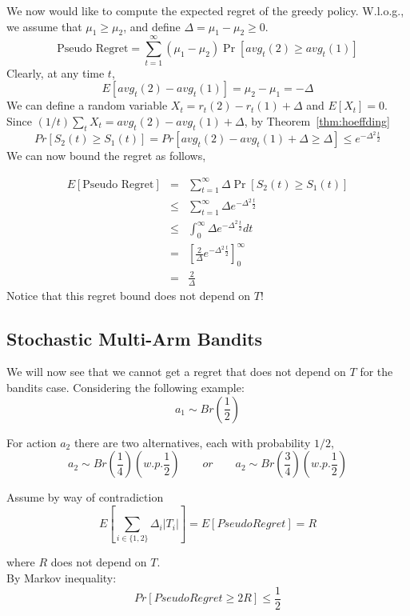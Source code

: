 We now would like to compute the expected regret of the greedy
policy. W.l.o.g., we assume that $\mu_{1}\ge\mu_{2}$, and define
$\Delta=\mu_{1}-\mu_{2}\ge0$.
\[
\text{Pseudo Regret}= \sum_{t=1}^{\infty}(\mu_{1}-\mu_{2})
\Pr\left[avg_{t}(2)\ge avg_{t}(1)\right]
\]
Clearly, at any time $t$,
\[
E[avg_{t}(2)-avg_{t}(1)]=\mu_{2}-\mu_{1}=-\Delta
\]
We can define a random variable $X_t=r_t(2)-r_t(1)+\Delta$ and
$E[X_t]=0$. Since $(1/t)\sum_t X_t = avg_t(2)- avg_t(1)+\Delta$, by
Theorem~\ref{thm:hoeffding}
\[
Pr[S_2(t)\geq S_1(t)]= Pr\left[avg_{t}(2)-avg_{t}(1)+\Delta
\ge\Delta\right]\le e^{-\Delta^{2}\frac{t}{2}}
\]
We can now bound the regret as follows,

\begin{align*}
E\left[\text{Pseudo Regret}\right] & = &
 \sum_{t=1}^{\infty}\Delta\Pr\left[S_{2}(t)\ge S_{1}(t)\right]\\
 & \le &  \sum_{t=1}^{\infty}\Delta e^{-\Delta^{2}\frac{t}{2}}\\
 & \le &  \int_{0}^{\infty}\Delta e^{-\Delta^{2}\frac{t}{2}}dt\\
 & = & \left[\frac{2}{\Delta}e^{-\Delta^{2}\frac{t}{2}}\right]_{0}^{\infty}\\
 & = & \frac{2}{\Delta}
\end{align*}
Notice that this regret bound does not depend on $T$!

\subsection{Stochastic Multi-Arm Bandits}


We will now see that we cannot get a regret that does not depend on
$T$ for the bandits case. Considering the following example:
\[
a_{1}\sim Br\left(\frac{1}{2}\right)\]

For action $a_2$ there are two alternatives, each with probability
$1/2$,
\[
a_{2}\sim Br\left(\frac{1}{4}\right) \left(w.p. \frac{1}{2}\right)
\qquad or \qquad a_{2}\sim Br\left(\frac{3}{4}\right) \left(w.p.
\frac{1}{2}\right)
\]

Assume by way of contradiction
\[
E\left[ \sum_{i \in \{1,2\}} \Delta_i |T_i|\right] = E\left[Pseudo
Regret\right]=R
\]

where $R$ does not depend on $T$. \\ By Markov inequality:
\[
Pr\left[Pseudo Regret\ge2R\right]\le\frac{1}{2}
\]

